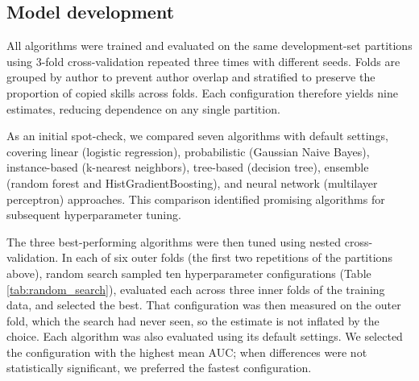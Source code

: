 \subsection{Model development}\label{model-development}

All algorithms were trained and evaluated on the same development-set
partitions using 3-fold cross-validation repeated three times with
different seeds. Folds are grouped by author to prevent author overlap
and stratified to preserve the proportion of copied skills across folds.
Each configuration therefore yields nine estimates, reducing dependence
on any single partition.

As an initial spot-check, we compared seven algorithms with default
settings, covering linear (logistic regression), probabilistic (Gaussian
Naive Bayes), instance-based (k-nearest neighbors), tree-based (decision
tree), ensemble (random forest and HistGradientBoosting), and neural
network (multilayer perceptron) approaches. This comparison identified
promising algorithms for subsequent hyperparameter tuning.

The three best-performing algorithms were then tuned using nested
cross-validation. In each of six outer folds (the first two repetitions
of the partitions above), random search sampled ten hyperparameter
configurations (Table \ref{tab:random_search}), evaluated each across
three inner folds of the training data, and selected the best. That
configuration was then measured on the outer fold, which the search had
never seen, so the estimate is not inflated by the choice. Each
algorithm was also evaluated using its default settings. We selected the
configuration with the highest mean AUC; when differences were not
statistically significant, we preferred the fastest configuration.

